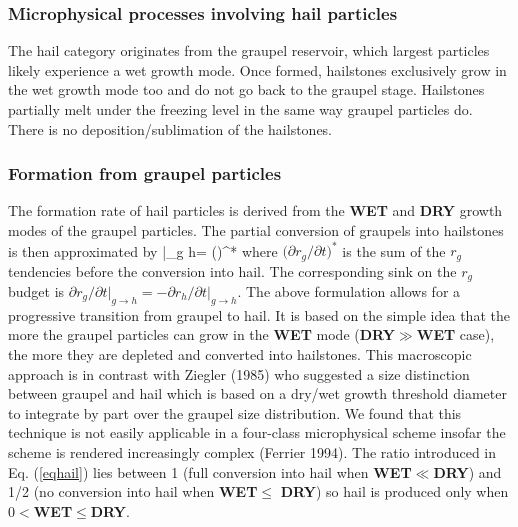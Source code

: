 \subsubsection{Microphysical processes involving hail particles}
%

The hail category originates from the graupel reservoir, which largest particles
likely experience a wet growth mode. Once formed, hailstones exclusively grow
in the wet growth mode too and do not go back to the graupel stage. Hailstones
partially melt under the freezing level in the same way graupel particles do. There is no deposition/sublimation of the hailstones.

%
\subsubsection{Formation from graupel particles}
%

The formation rate of hail particles is derived from the {\bf WET} and {\bf DRY}
growth modes of the graupel particles. The partial conversion of graupels into
hailstones is then approximated by
%
\be\label{eqhail} 
\Big|_{g \rightarrow h}=
                               \Big(\Big)^{*}
                               \times
\ee
%
where $\big({\partial r_g}/{\partial t}\big)^{*}$ is the sum of the $r_g$
tendencies before the conversion into hail. The corresponding sink on the $r_g$
budget is ${\partial r_g}/{\partial t}\big|_{g \rightarrow h}=
-{\partial r_h}/{\partial t}\big|_{g \rightarrow h}$. The above formulation
allows for a progressive transition from graupel to hail. It is based on
the simple idea that the more the graupel particles can grow in the {\bf WET}
mode ({\bf DRY}$\gg${\bf WET} case), the more they are depleted and converted
into hailstones. This macroscopic approach is in contrast with Ziegler (1985)
who suggested a size distinction between graupel and hail which is based on a
dry/wet growth threshold diameter to integrate by part over the graupel size
distribution. We found that this technique is not easily applicable in a four-class microphysical scheme insofar the scheme is rendered increasingly complex
(Ferrier 1994).
The ratio introduced in Eq. (\ref{eqhail}) lies between 1 (full conversion into hail
when {\bf WET}$\ll${\bf DRY}) and 1/2 (no conversion into hail
when {\bf WET}$\leq$ {\bf DRY}) so hail is produced only when $0<${\bf WET}$\leq${\bf DRY}.

